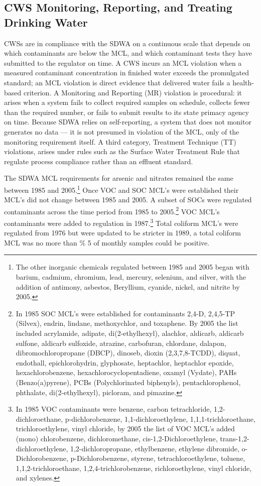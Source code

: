 \documentclass{article}
\begin{document}
\subsection{CWS Monitoring, Reporting, and Treating Drinking Water}

CWSs are in compliance with the SDWA on a continuous scale that depends on which contaminants are below the MCL, and which contaminant tests they have submitted to the regulator on time. A CWS incurs an MCL violation when a measured contaminant concentration in finished water exceeds the promulgated standard; an MCL violation is direct evidence that delivered water fails a health-based criterion. A Monitoring and Reporting (MR) violation is procedural: it arises when a system fails to collect required samples on schedule, collects fewer than the required number, or fails to submit results to its state primacy agency on time. Because SDWA relies on self-reporting, a system that does not monitor generates no data — it is not presumed in violation of the MCL, only of the monitoring requirement itself. A third category, Treatment Technique (TT) violations, arises under rules such as the Surface Water Treatment Rule that regulate process compliance rather than an effluent standard.

The SDWA MCL requirements for arsenic and nitrates remained the same between 1985 and 2005.\footnote{The other inorganic chemicals regulated between 1985 and 2005 began with barium, cadmium, chromium, lead, mercury, selenium, and silver, with the addition of antimony, asbestos, Beryllium, cyanide, nickel, and nitrite by 2005.} Once VOC and SOC MCL's were established their MCL's did not change between 1985 and 2005. A subset of SOCs were regulated contaminants across the time period from 1985 to 2005.\footnote{In 1985 SOC MCL's were established for contaminants 2,4-D, 2,4,5-TP (Silvex), endrin, lindane, methoxychlor, and toxaphene. By 2005 the list included acrylamide, adipate, di(2-ethylhexyl), alachlor, aldicarb, aldicarb sulfone, aldicarb sulfoxide, atrazine, carbofuran, chlordane, dalapon, dibromochloropropane (DBCP), dinoseb, dioxin (2,3,7,8-TCDD), diquat, endothall, epichlorohydrin, glyphosate, heptachlor, heptachlor epoxide, hexachlorobenzene, hexachlorocyclopentadiene, oxamyl (Vydate), PAHs (Benzo(a)pyrene), PCBs (Polychlorinated biphenyls), pentachlorophenol, phthalate, di(2-ethylhexyl), picloram, and pimazine.} VOC MCL's contaminants were added to regulation in 1987.\footnote{In 1985 VOC contaminants were benzene, carbon tetrachloride, 1,2-dichloroethane, p-dichlorobenzene, 1,1-dichloroethylene, 1,1,1-trichloroethane, trichloroethylene, vinyl chloride, by 2005 the list of VOC MCL's added (mono) chlorobenzene, dichloromethane, cis-1,2-Dichloroethylene, trans-1,2-dichloroethylene, 1,2-dichloropropane, ethylbenzene, ethylene dibromide, o-Dichlorobenzene, p-Dichlorobenzene, styrene, tetrachloroethylene, toluene, 1,1,2-trichloroethane, 1,2,4-trichlorobenzene, richloroethylene, vinyl chloride, and xylenes.} Total coliform MCL's were regulated from 1976 but were updated to be stricter in 1989, a total coliform MCL was no more than \% 5 of monthly samples could be positive.
\end{document}

